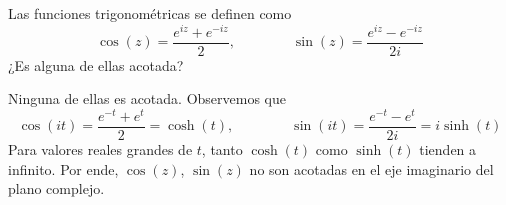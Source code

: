 \begin{exercise}
Las funciones trigonométricas se definen como
$$
\cos(z) = \frac {e^{iz} + e^{-iz}} 2, \qquad \qquad
\sin(z) = \frac {e^{iz} - e^{-iz}} {2i}
$$
¿Es alguna de ellas acotada?
\end{exercise}

\begin{solution}
Ninguna de ellas es acotada. Observemos que
$$
\cos(it) = \frac {e^{-t} + e^t} 2 = \cosh(t), \qquad \qquad
\sin(it) = \frac {e^{-t} - e^t} {2i} = i \sinh(t)
$$
Para valores reales grandes de $t$, tanto $\cosh(t)$ como $\sinh(t)$ tienden a infinito. Por ende, $\cos(z)$, $\sin(z)$ no son acotadas en el eje imaginario del plano complejo.
\end{solution}
